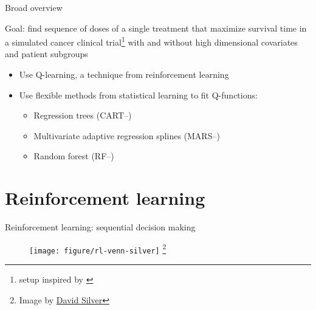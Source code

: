 \documentclass[handout]{beamer}
\newcommand\blfootnote[1]{%
  \begingroup
  \renewcommand\thefootnote{}\footnote{#1}%
  \addtocounter{footnote}{-1}%
  \endgroup
}
\begin{document}
\begin{frame}[c]{Broad overview}

Goal: find sequence of doses of a single treatment that maximize survival time in a simulated cancer clinical trial\footnote{setup inspired by \textcite{crt}} with and without high dimensional covariates and patient subgroups
\begin{itemize}[<+(1)->]
    \item Use Q-learning, a technique from reinforcement learning
    \item Use flexible methods from statistical learning to fit Q-functions: 
    \begin{itemize}[<+->]
      \item Regression trees (CART--\cite{CART})
      \item Multivariate adaptive regression splines (MARS--\cite{mars})
      \item Random forest (RF--\cite{rf})
    \end{itemize} 
\end{itemize}

\end{frame}

\section{Reinforcement learning} %
\label{sec:reinforcement_learning}

\begin{frame}[c]{Reinforcement learning: sequential decision making}
  \begin{figure}
    \centering
    \texttt{[image: figure/rl-venn-silver]}\blfootnote{\scriptsize Image by \href{http://www0.cs.ucl.ac.uk/staff/D.Silver/web/Teaching.html}{David Silver}}
  \end{figure}
\end{frame}
\end{document}
